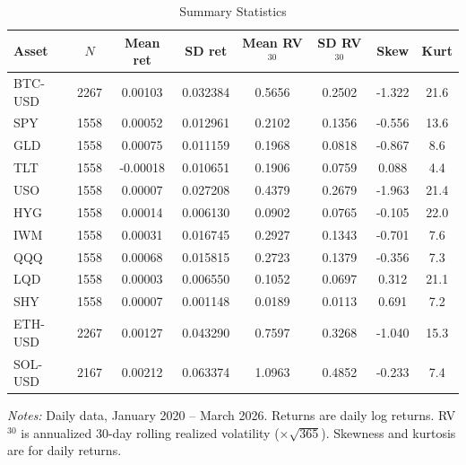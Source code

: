 \begin{table}[htbp]
  \centering
  \caption{Summary Statistics}\label{tab:sumstats}
  \begin{threeparttable}
    \begin{tabular}{l S[table-format=5.0] S[table-format=1.5] S[table-format=1.6] S[table-format=1.4] S[table-format=1.4] S[table-format=-1.3] S[table-format=2.1]}
      \toprule
      {Asset} & {$N$} & {Mean ret} & {SD ret} & {Mean RV$^{30}$} & {SD RV$^{30}$} & {Skew} & {Kurt} \\
      \midrule
      BTC-USD & 2267 & 0.00103 & 0.032384 & 0.5656 & 0.2502 & -1.322 & 21.6 \\
      SPY & 1558 & 0.00052 & 0.012961 & 0.2102 & 0.1356 & -0.556 & 13.6 \\
      GLD & 1558 & 0.00075 & 0.011159 & 0.1968 & 0.0818 & -0.867 & 8.6 \\
      TLT & 1558 & -0.00018 & 0.010651 & 0.1906 & 0.0759 & 0.088 & 4.4 \\
      USO & 1558 & 0.00007 & 0.027208 & 0.4379 & 0.2679 & -1.963 & 21.4 \\
      HYG & 1558 & 0.00014 & 0.006130 & 0.0902 & 0.0765 & -0.105 & 22.0 \\
      IWM & 1558 & 0.00031 & 0.016745 & 0.2927 & 0.1343 & -0.701 & 7.6 \\
      QQQ & 1558 & 0.00068 & 0.015815 & 0.2723 & 0.1379 & -0.356 & 7.3 \\
      LQD & 1558 & 0.00003 & 0.006550 & 0.1052 & 0.0697 & 0.312 & 21.1 \\
      SHY & 1558 & 0.00007 & 0.001148 & 0.0189 & 0.0113 & 0.691 & 7.2 \\
      ETH-USD & 2267 & 0.00127 & 0.043290 & 0.7597 & 0.3268 & -1.040 & 15.3 \\
      SOL-USD & 2167 & 0.00212 & 0.063374 & 1.0963 & 0.4852 & -0.233 & 7.4 \\
      \bottomrule
    \end{tabular}
    \begin{tablenotes}[flushleft]
      \small
      \item \textit{Notes:} Daily data, January 2020 -- March 2026. Returns are daily log returns.
        RV$^{30}$ is annualized 30-day rolling realized volatility ($\times\sqrt{365}$).
        Skewness and kurtosis are for daily returns.
    \end{tablenotes}
  \end{threeparttable}
\end{table}
